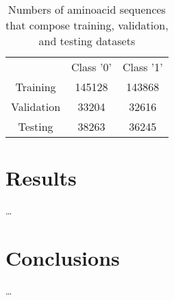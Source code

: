 \documentclass[12pt]{report}
\begin{document}
	\begin{table}[h!]
		\caption{Numbers of aminoacid sequences that compose training, 
		validation, and testing datasets}
		\label{table:2} 
		\vspace{0.2cm}
		\centering
		\begin{tabular}{ c c c }
			 & Class '0' & Class '1' \\
			Training & 145128 & 143868 \\ 
			Validation & 33204 & 32616 \\
			Testing & 38263 & 36245   
		\end{tabular}
	\end{table}

	\newpage

	\section{Results}

	\dots

	\section{Conclusions}

	\dots

	\nocite{*}
	
	\normalsize

 

\end{document}
